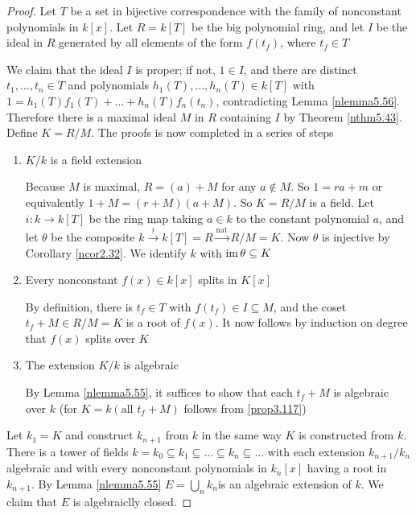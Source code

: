 \documentclass[11pt]{article}
\begin{document}
\begin{proof}
Let \(T\) be a set in bijective correspondence with the family of nonconstant
polynomials in \(k[x]\). Let \(R=k[T]\) be the big polynomial ring, and let
\(I\) be the ideal in \(R\) generated by all elements of the form \(f(t_f)\),
where \(t_f\in T\)

We claim that the ideal \(I\) is proper; if not, \(1\in I\), and there are
distinct \(t_1,\dots,t_n\in T\) and polynomials \(h_1(T),\dots,h_n(T)\in
   k[T]\) with \(1=h_1(T)f_1(T)+\dots+h_n(T)f_n(t_n)\), contradicting Lemma
\ref{nlemma5.56}. Therefore there is a maximal ideal \(M\) in \(R\) containing \(I\)
by Theorem \ref{nthm5.43}. Define \(K=R/M\). The proofs is now completed in a
series of steps
\begin{enumerate}
\item \(K/k\) is a field extension

Because \(M\) is maximal, \(R=(a)+M\) for any \(a\not\in M\). So \(1=ra+m\)
or equivalently \(1+M=(r+M)(a+M)\). So \(K=R/M\) is a field. Let 
\(i:k\to k[T]\) be the ring map taking \(a\in k\) to the constant
polynomial \(a\), and let \(\theta\) be the composite 
\(k\xrightarrow{i}k[T]=R\xrightarrow{\text{nat}}R/M=K\). Now \(\theta\) is injective
by Corollary \ref{ncor2.32}. We identify \(k\) with \(\operatorname{im}\theta\subseteq K\)

\item Every nonconstant \(f(x)\in k[x]\) splits in \(K[x]\)

By definition, there is \(t_f\in T\) with \(f(t_f)\in I\subseteq M\), and
the coset \(t_f+M\in R/M=K\) is a root of \(f(x)\). It now follows by
induction on degree that \(f(x)\) splits over \(K\)

\item The extension \(K/k\) is algebraic

By Lemma \ref{nlemma5.55}, it suffices to show that each \(t_f+M\) is
algebraic over \(k\) (for \(K=k(\text{all }t_f+M)\) follows from
\ref{prop3.117})
\end{enumerate}


Let \(k_1=K\) and construct \(k_{n+1}\) from \(k\) in the same way \(K\) is
constructed from \(k\). There is a tower of fields 
\(k=k_0\subseteq k_1\subseteq \dots\subseteq k_n\subseteq\dots\) with each
extension \(k_{n+1}/k_n\) algebraic and with every nonconstant polynomials in
\(k_n[x]\) having a root in \(k_{n+1}\). By Lemma \ref{nlemma5.55}
\(E=\bigcup_nk_n\)is an algebraic extension of \(k\). We claim that \(E\) is
algebraiclly closed.
\end{proof}
\end{document}
